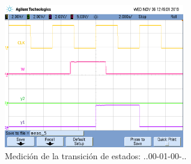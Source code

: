 \begin{figure}[H]
\centering
\includegraphics[width=0.7\textwidth,trim={0 3.35cm 0.1cm 1.75cm},clip]{ImagenesEjercicio3/states2.png}
\caption{Medición de la transición de estados: ..00-01-00-..}
\label{states2}
\end{figure}

